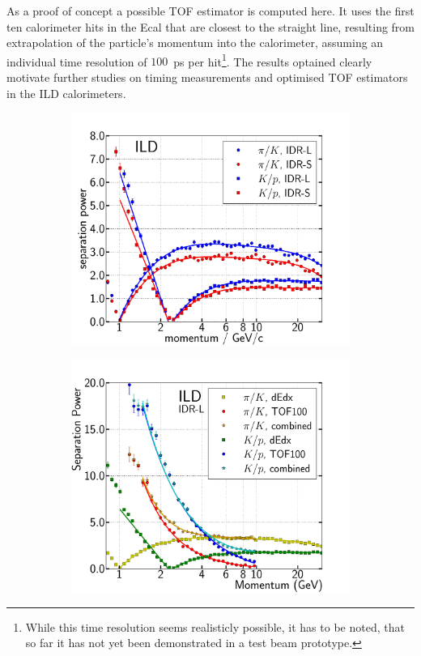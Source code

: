 As a proof of concept a possible TOF estimator is computed here. It uses the first ten calorimeter hits in the Ecal that are closest to the straight line,
resulting from extrapolation of the particle's momentum into the calorimeter, assuming an individual time resolution of $100$~ps
per hit\footnote{While this time resolution seems realisticly possible, it has to be noted, that so far it has not yet been demonstrated
 in a test beam prototype.}. The results optained clearly motivate further studies on timing measurements and optimised TOF estimators
in the ILD calorimeters.
%
% 
\begin{figure}[htbp]
\begin{subfigure}{0.49\hsize}
 \includegraphics[width=\hsize]{Performance/fig/dEdx_ILDls_separation_power.pdf}
 \caption{ \label{fig:perf:dedx_sep}}
 \end{subfigure}
\begin{subfigure}{0.49\hsize}
 \includegraphics[width=\hsize]{Performance/fig/Combined_dEdx_TOF100_HiStat.pdf}

\end{subfigure}
\end{figure}
